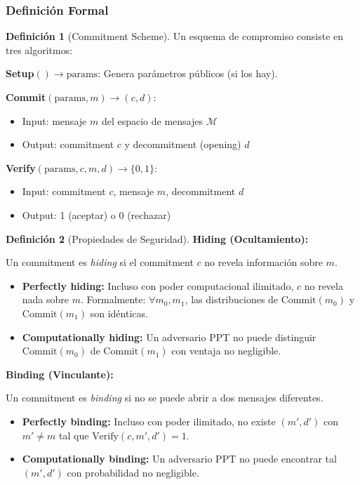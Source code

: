 \documentclass[11pt,a4paper,twoside,openright]{book}
\theoremstyle{definition}
\newtheorem{definition}{Definición}[chapter]
\theoremstyle{plain}
\theoremstyle{remark}
\begin{document}
\subsubsection{Definición Formal}

\begin{definition}[Commitment Scheme]
Un esquema de compromiso consiste en tres algoritmos:

\textbf{Setup}$() \to \text{params}$:
Genera parámetros públicos (si los hay).

\textbf{Commit}$(\text{params}, m) \to (c, d)$:
\begin{itemize}
    \item Input: mensaje $m$ del espacio de mensajes $\mathcal{M}$
    \item Output: commitment $c$ y decommitment (opening) $d$
\end{itemize}

\textbf{Verify}$(\text{params}, c, m, d) \to \{0, 1\}$:
\begin{itemize}
    \item Input: commitment $c$, mensaje $m$, decommitment $d$
    \item Output: 1 (aceptar) o 0 (rechazar)
\end{itemize}
\end{definition}

\begin{definition}[Propiedades de Seguridad]
\textbf{Hiding (Ocultamiento):}

Un commitment es \textit{hiding} si el commitment $c$ no revela información sobre $m$.

\begin{itemize}
    \item \textbf{Perfectly hiding:} Incluso con poder computacional ilimitado, $c$ no revela nada sobre $m$. Formalmente: $\forall m_0, m_1$, las distribuciones de $\text{Commit}(m_0)$ y $\text{Commit}(m_1)$ son idénticas.
    
    \item \textbf{Computationally hiding:} Un adversario PPT no puede distinguir $\text{Commit}(m_0)$ de $\text{Commit}(m_1)$ con ventaja no negligible.
\end{itemize}

\textbf{Binding (Vinculante):}

Un commitment es \textit{binding} si no se puede abrir a dos mensajes diferentes.

\begin{itemize}
    \item \textbf{Perfectly binding:} Incluso con poder ilimitado, no existe $(m', d')$ con $m' \neq m$ tal que $\text{Verify}(c, m', d') = 1$.
    
    \item \textbf{Computationally binding:} Un adversario PPT no puede encontrar tal $(m', d')$ con probabilidad no negligible.
\end{itemize}
\end{definition}
\end{document}
